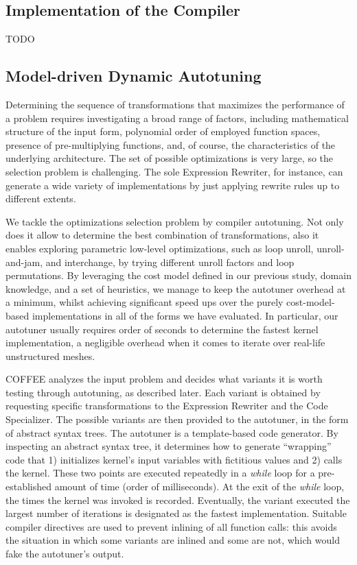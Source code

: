 \subsection{Implementation of the Compiler}
TODO

\subsection{Model-driven Dynamic Autotuning}
\label{sec:coffee-autotune}

Determining the sequence of transformations that maximizes the performance of a problem requires investigating a broad range of factors, including mathematical structure of the input form, polynomial order of employed function spaces, presence of pre-multiplying functions, and, of course, the characteristics of the underlying architecture. The set of possible optimizations is very large, so the selection problem is challenging. The sole Expression Rewriter, for instance, can generate a wide variety of implementations by just applying rewrite rules up to different extents.  

We tackle the optimizations selection problem by compiler autotuning. Not only does it allow to determine the best combination of transformations, also it enables exploring parametric low-level optimizations, such as loop unroll, unroll-and-jam, and interchange, by trying different unroll factors and loop permutations. By leveraging the cost model defined in our previous study, domain knowledge, and a set of heuristics, we manage to keep the autotuner overhead at a minimum, whilst achieving significant speed ups over the purely cost-model-based implementations in all of the forms we have evaluated. In particular, our autotuner usually requires order of seconds to determine the fastest kernel implementation, a negligible overhead when it comes to iterate over real-life unstructured meshes.

COFFEE analyzes the input problem and decides what variants it is worth testing through autotuning, as described later. Each variant is obtained by requesting specific transformations to the Expression Rewriter and the Code Specializer. The possible variants are then provided to the autotuner, in the form of abstract syntax trees. The autotuner is a template-based code generator. By inspecting an abstract syntax tree, it determines how to generate ``wrapping'' code that 1) initializes kernel's input variables with fictitious values and 2) calls the kernel. These two points are executed repeatedly in a \emph{while} loop for a pre-established amount of time (order of milliseconds). At the exit of the \emph{while} loop, the times the kernel was invoked is recorded. Eventually, the variant executed the largest number of iterations is designated as the fastest implementation. Suitable compiler directives are used to prevent inlining of all function calls: this avoids the situation in which some variants are inlined and some are not, which would fake the autotuner's output. 

